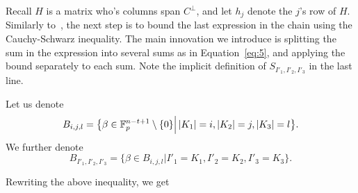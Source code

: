 Recall $H$ is a matrix who's columns span $C^\bot$, and let $h_j$ denote the $j$'s row of $H$.
Similarly to~\cite{EPRINT:BDIR19}, the next step is to bound the last expression in the chain using the Cauchy-Schwarz inequality.
The main innovation we introduce is splitting the sum in the expression into several sums as in Equation~\ref{eq:5}, and applying the bound separately to each sum.
Note the implicit definition of $S_{I'_1,I'_2,I'_3}$ in the last line.

\noindent Let us denote 
$$B_{i,j,l}=\big\{\beta\in  \mathbb{F}^{n-t+1}_p\setminus{\{0\}} \Big| \left| K_1 \right|=i, \left| K_2 \right|=j, \left| K_3 \right|=l\big\}.$$  
\noindent We further denote 
$$B_{I'_1,I'_2,I'_3}=\big\{\beta\in B_{i,j,l} \Big| I'_1=K_1, I'_2=K_2, I'_3=K_3 \big\}. $$


\noindent Rewriting the above inequality, we get

